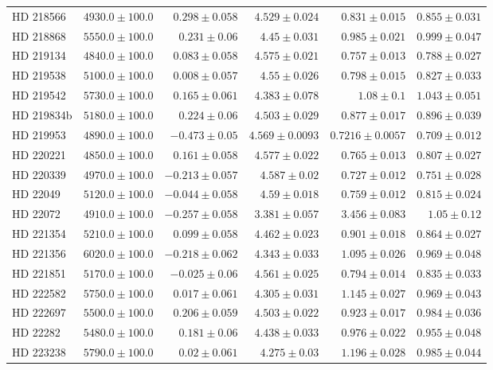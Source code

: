 \begin{longtable*}{lrrrrr}
HD 218566 & $4930.0\pm 100.0$ & $0.298\pm 0.058$ & $4.529\pm 0.024$ & $0.831\pm 0.015$ & $0.855\pm 0.031$ \\ 
HD 218868 & $5550.0\pm 100.0$ & $0.231\pm 0.06$ & $4.45\pm 0.031$ & $0.985\pm 0.021$ & $0.999\pm 0.047$ \\ 
HD 219134 & $4840.0\pm 100.0$ & $0.083\pm 0.058$ & $4.575\pm 0.021$ & $0.757\pm 0.013$ & $0.788\pm 0.027$ \\ 
HD 219538 & $5100.0\pm 100.0$ & $0.008\pm 0.057$ & $4.55\pm 0.026$ & $0.798\pm 0.015$ & $0.827\pm 0.033$ \\ 
HD 219542 & $5730.0\pm 100.0$ & $0.165\pm 0.061$ & $4.383\pm 0.078$ & $1.08\pm 0.1$ & $1.043\pm 0.051$ \\ 
HD 219834b & $5180.0\pm 100.0$ & $0.224\pm 0.06$ & $4.503\pm 0.029$ & $0.877\pm 0.017$ & $0.896\pm 0.039$ \\ 
HD 219953 & $4890.0\pm 100.0$ & $-0.473\pm 0.05$ & $4.569\pm 0.0093$ & $0.7216\pm 0.0057$ & $0.709\pm 0.012$ \\ 
HD 220221 & $4850.0\pm 100.0$ & $0.161\pm 0.058$ & $4.577\pm 0.022$ & $0.765\pm 0.013$ & $0.807\pm 0.027$ \\ 
HD 220339 & $4970.0\pm 100.0$ & $-0.213\pm 0.057$ & $4.587\pm 0.02$ & $0.727\pm 0.012$ & $0.751\pm 0.028$ \\ 
HD 22049 & $5120.0\pm 100.0$ & $-0.044\pm 0.058$ & $4.59\pm 0.018$ & $0.759\pm 0.012$ & $0.815\pm 0.024$ \\ 
HD 22072 & $4910.0\pm 100.0$ & $-0.257\pm 0.058$ & $3.381\pm 0.057$ & $3.456\pm 0.083$ & $1.05\pm 0.12$ \\ 
HD 221354 & $5210.0\pm 100.0$ & $0.099\pm 0.058$ & $4.462\pm 0.023$ & $0.901\pm 0.018$ & $0.864\pm 0.027$ \\ 
HD 221356 & $6020.0\pm 100.0$ & $-0.218\pm 0.062$ & $4.343\pm 0.033$ & $1.095\pm 0.026$ & $0.969\pm 0.048$ \\ 
HD 221851 & $5170.0\pm 100.0$ & $-0.025\pm 0.06$ & $4.561\pm 0.025$ & $0.794\pm 0.014$ & $0.835\pm 0.033$ \\ 
HD 222582 & $5750.0\pm 100.0$ & $0.017\pm 0.061$ & $4.305\pm 0.031$ & $1.145\pm 0.027$ & $0.969\pm 0.043$ \\ 
HD 222697 & $5500.0\pm 100.0$ & $0.206\pm 0.059$ & $4.503\pm 0.022$ & $0.923\pm 0.017$ & $0.984\pm 0.036$ \\ 
HD 22282 & $5480.0\pm 100.0$ & $0.181\pm 0.06$ & $4.438\pm 0.033$ & $0.976\pm 0.022$ & $0.955\pm 0.048$ \\ 
HD 223238 & $5790.0\pm 100.0$ & $0.02\pm 0.061$ & $4.275\pm 0.03$ & $1.196\pm 0.028$ & $0.985\pm 0.044$ \\ 

\end{longtable*}
